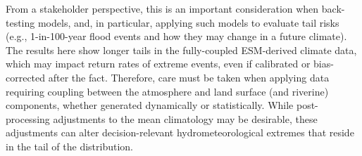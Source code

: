 \documentclass[nhess, manuscript]{copernicus}
\begin{document}
From a stakeholder perspective, this is an important consideration when back-testing models, and, in particular, applying such models to evaluate tail risks (e.g., 1-in-100-year flood events and how they may change in a future climate).
The results here show longer tails in the fully-coupled ESM-derived climate data, which may impact return rates of extreme events, even if calibrated or bias-corrected after the fact.
Therefore, care must be taken when applying data requiring coupling between the atmosphere and land surface (and riverine) components, whether generated dynamically or statistically.
While post-processing adjustments to the mean climatology may be desirable, these adjustments can alter decision-relevant hydrometeorological extremes that reside in the tail of the distribution.







%
%
%
%
%
%
%
%
%
%
\end{document}
